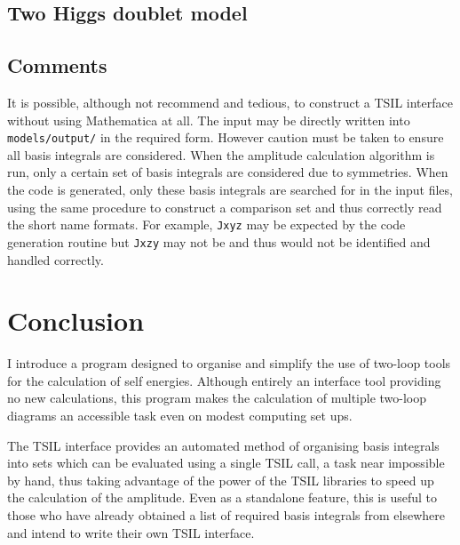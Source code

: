 \subsection{Two Higgs doublet model}




\subsection{Comments}

It is possible, although not recommend and tedious, to construct a TSIL interface without using Mathematica at all.  The input may be directly written into \lstinline{models/output/} in the required form.  However caution must be taken to ensure all basis integrals are considered.  When the amplitude calculation algorithm is run, only a certain set of basis integrals are considered due to symmetries.  When the code is generated, only these basis integrals are searched for in the input files, using the same procedure to construct a comparison set and thus correctly read the short name formats.  For example, \lstinline{Jxyz} may be expected by the code generation routine but \lstinline{Jxzy} may not be and thus would not be identified and handled correctly.


\section{Conclusion}

I introduce a program designed to organise and simplify the use of two-loop tools for the calculation of self energies.  Although entirely an interface tool providing no new calculations, this program makes the calculation of multiple two-loop diagrams an accessible task even on modest computing set ups.

The TSIL interface provides an automated method of organising basis integrals into sets which can be evaluated using a single TSIL call, a task near impossible by hand, thus taking advantage of the power of the TSIL libraries to speed up the calculation of the amplitude.  Even as a standalone feature, this is useful to those who have already obtained a list of required basis integrals from elsewhere and intend to write their own TSIL interface.


{}


  